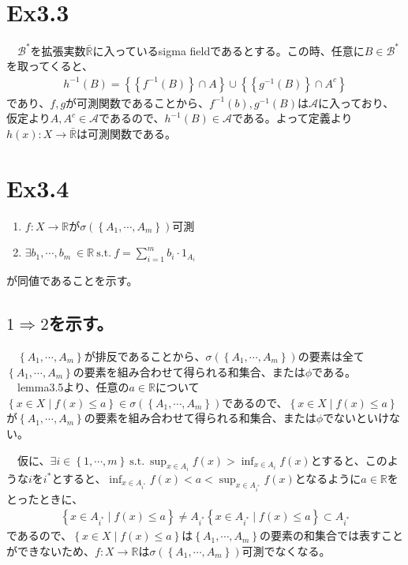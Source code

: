 \documentclass{article}
\begin{document}
\section{Ex3.3}
　$\mathcal{B}^{*}$を拡張実数$\bar{\mathbb{R}}$に入っているsigma fieldであるとする。この時、任意に$B \in \mathcal{B}^{*}$を取ってくると、
\begin{align*}
	h^{-1}(B) = \left\{ \left\{ f^{-1}(B) \right\}\cap A \right\} \cup \left\{ \left\{ g^{-1}(B) \right\}\cap A^c \right\}
\end{align*}
であり、$f,g$が可測関数であることから、$f^{-1}(b),g^{-1}(B)$は$\mathcal{A}$に入っており、仮定より$A,A^c\in \mathcal{A}$であるので、$h^{-1}(B)\in \mathcal{A}$である。よって定義より$h(x):X\to\bar{\mathbb{R}}$は可測関数である。


\section{Ex3.4}
\begin{enumerate}
	\item $f:X\to\mathbb{R}$が$\sigma\left( \left\{ A_1, \cdots, A_m\right\} \right)$可測
	\item $\exists b_1,\cdots,b_m\ \in \mathbb{R}\ \text{s.t.}\ f = \sum_{i=1}^{m} b_i \cdot 1_{A_i}$
\end{enumerate}
が同値であることを示す。

\subsection{$1\Rightarrow 2$を示す。}
　$\left\{ A_1, \cdots, A_m\right\}$が排反であることから、$\sigma\left( \left\{ A_1, \cdots, A_m\right\} \right)$の要素は全て$\left\{ A_1, \cdots, A_m\right\}$の要素を組み合わせて得られる和集合、または$\phi$である。
　lemma3.5より、任意の$a\in \mathbb{R}$について$\left\{ x\in X\mid f(x)\leq a \right\} \in \sigma\left( \left\{ A_1, \cdots, A_m\right\} \right)$であるので、$\left\{ x\in X\mid f(x)\leq a \right\}$が$\left\{ A_1, \cdots, A_m\right\}$の要素を組み合わせて得られる和集合、または$\phi$でないといけない。

　仮に、$\exists i\in \left\{ 1,\cdots, m \right\}\ \text{s.t.}\ \sup_{x\in A_i} f(x) > \inf_{x\in A_i} f(x)$とすると、このような$i$を$i^{*}$とすると、$\inf_{x\in A_{i^{*}}} f(x) < a < \sup_{x\in A_{i^{*}}} f(x)$となるように$a\in \mathbb{R}$をとったときに、
\begin{align*}
	\left\{ x\in A_{i^{*}} \mid f(x)\leq a \right\} \neq A_{i^{*}}
	\left\{ x\in A_{i^{*}} \mid f(x)\leq a \right\} \subset A_{i^{*}}
\end{align*}
であるので、$\left\{ x\in X \mid f(x)\leq a \right\}$は$\left\{ A_1, \cdots, A_m\right\}$の要素の和集合では表すことができないため、$f:X\to \mathbb{R}$は$\sigma\left( \left\{ A_1, \cdots, A_m\right\} \right)$可測でなくなる。
\end{document}
